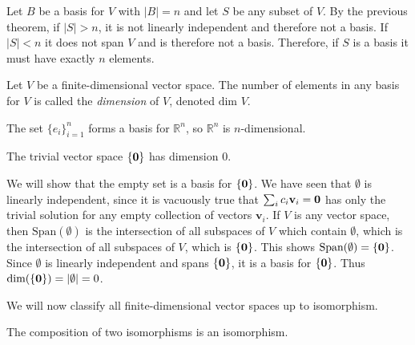 \documentclass[12pt,letterpaper,reqno]{article}
\numberwithin{equation}{section}
\newcommand{\bv}{\mathbf{v}}
\begin{document}
\begin{pf}
	Let $B$ be a basis for $V$ with $|B|=n$ and let $S$ be any subset of $V$. By the previous theorem, if $|S|>n$, it is not linearly independent and therefore not a basis. If $|S|<n$ it does not span $V$ and is therefore not a basis. Therefore, if $S$ is a basis it must have exactly $n$ elements.
\end{pf}

\begin{defn}
	Let $V$ be a finite-dimensional vector space. The number of elements in any basis for $V$ is called the \emph{dimension} of $V$, denoted $\text{dim } V$.
\end{defn}

\begin{example}
	The set $\{e_i\}_{i=1}^n$ forms a basis for $\mathbb{R}^n$, so $\mathbb{R}^n$ is $n$-dimensional.
\end{example}

\begin{prop}
The trivial vector space $\{{\bf 0}\}$ has dimension $0$.
\end{prop}

\begin{pf}
	We will show that the empty set is a basis for $\{{\bf 0}\}$. We have seen that $\emptyset$ is linearly independent, since it is vacuously true that $\sum_{i}c_i\bv_i={\bf 0}$ has only the trivial solution for any empty collection of vectors $\bv_i$. If $V$ is any vector space, then $\text{Span}(\emptyset)$ is the intersection of all subspaces of $V$ which contain $\emptyset$, which is the intersection of all subspaces of $V$, which is $\{{\bf 0}\}$. This shows $\text{Span}(\emptyset)=\{{\bf 0}\}$. Since $\emptyset$ is linearly independent and spans $\{{\bf 0}\}$, it is a basis for $\{{\bf 0}\}$. Thus $\text{dim}(\{{\bf 0}\})=|\emptyset|=0$.
\end{pf}

We will now classify all finite-dimensional vector spaces up to isomorphism.

\begin{lem}
	The composition of two isomorphisms is an isomorphism.
\end{lem}
\end{document}
